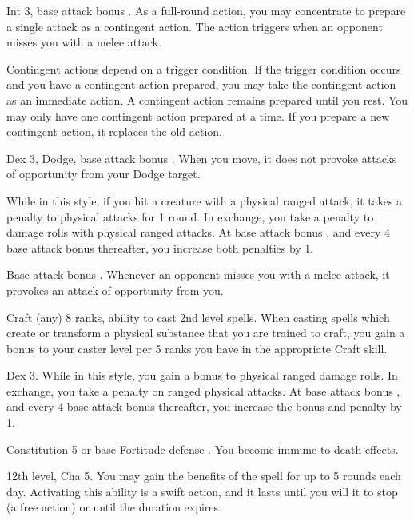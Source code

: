 \featpre Int 3, base attack bonus .
\featben As a full-round action, you may concentrate to prepare a single attack as a contingent action. The action triggers when an opponent misses you with a melee attack.

Contingent actions depend on a trigger condition. If the trigger condition occurs and you have a contingent action prepared, you may take the contingent action as an immediate action. A contingent action remains prepared until you rest. You may only have one contingent action prepared at a time. If you prepare a new contingent action, it replaces the old action.

 Dex 3, Dodge, base attack bonus .
 When you move, it does not provoke attacks of opportunity from your Dodge target.

 While in this style, if you hit a creature with a physical ranged attack, it takes a  penalty to physical attacks for 1 round. In exchange, you take a  penalty to damage rolls with physical ranged attacks. At base attack bonus , and every 4 base attack bonus thereafter, you increase both penalties by 1.

\featpre Base attack bonus .
\featben Whenever an opponent misses you with a melee attack, it provokes an attack of opportunity from you.

\featpres Craft (any) 8 ranks, ability to cast 2nd level spells.
\featben When casting spells which create or transform a physical substance that you are trained to craft, you gain a  bonus to your caster level per 5 ranks you have in the appropriate Craft skill.

 Dex 3.
 While in this style, you gain a  bonus to physical ranged damage rolls. In exchange, you take a  penalty on ranged physical attacks. At base attack bonus , and every 4 base attack bonus thereafter, you increase the bonus and penalty by 1.

\featpre Constitution 5 or base Fortitude defense .
\featben You become immune to death effects.

\featpre 12th level, Cha 5.
\featben You may gain the benefits of the  spell for up to 5 rounds each day. Activating this ability is a swift action, and it lasts until you will it to stop (a free action) or until the duration expires.

